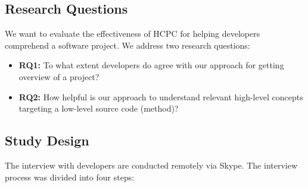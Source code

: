 \subsection{Research Questions}
\label{hla3:evaluation}
We want to evaluate the effectiveness of HCPC for helping developers comprehend a software project. We address two research questions:
\begin{itemize}
    \item \textbf{RQ1:} To what extent developers do agree with our approach for getting overview of a project?
    \item \textbf{RQ2:} How helpful is our approach to understand relevant high-level concepts targeting a low-level source code (method)?
\end{itemize}
\subsection{Study Design}
The interview with developers are conducted remotely via Skype. The interview process was divided into four steps:
